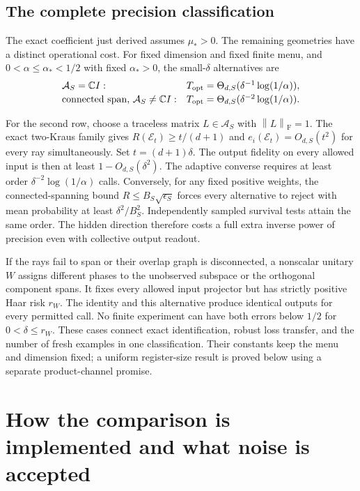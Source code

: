 \documentclass[11pt,a4paper]{article}
\newcommand{\normF}[1]{\left\lVert #1\right\rVert_{\mathrm F}}
\numberwithin{equation}{section}
\begin{document}
\begin{samepage}
\subsection{The complete precision classification}

The exact coefficient just derived assumes $\mu_*>0$. The remaining
geometries have a distinct operational cost. For fixed dimension and fixed
finite menu, and $0<\alpha\le\alpha_*<1/2$ with fixed $\alpha_*>0$,
the small-$\delta$ alternatives are
\[
\begin{array}{ll}
\mathcal A_S=\mathbb CI:
 & T_{\rm opt}=\Theta_{d,S}(\delta^{-1}\log(1/\alpha)),\\[2pt]
\text{connected span, }\mathcal A_S\ne\mathbb CI:
 & T_{\rm opt}=\Theta_{d,S}(\delta^{-2}\log(1/\alpha)).
\end{array}
\]
\end{samepage}
For the second row, choose a traceless matrix $L\in\mathcal A_S$ with
$\normF L=1$. The exact two-Kraus family gives
$R(\mathcal E_t)\ge t/(d+1)$ and $e_i(\mathcal E_t)=O_{d,S}(t^2)$
for every ray simultaneously. Set $t=(d+1)\delta$. The output fidelity
on every allowed input is then at least $1-O_{d,S}(\delta^2)$.
The adaptive converse requires at least order
$\delta^{-2}\log(1/\alpha)$ calls. Conversely, for any fixed positive
weights, the connected-spanning bound $R\le B_S\sqrt{\epsilon_S}$
forces every alternative to reject with mean probability at least
$\delta^2/B_S^2$. Independently sampled survival tests attain the same
order. The hidden direction therefore costs a full extra inverse power
of precision even with collective output readout.

If the rays fail to span or their overlap graph is disconnected, a
nonscalar unitary $W$ assigns different phases to the unobserved subspace
or the orthogonal component spans. It fixes every allowed input projector
but has strictly positive Haar risk $r_W$. The identity and this alternative
produce identical outputs for every permitted call. No finite experiment
can have both errors below $1/2$ for $0<\delta\le r_W$.
These cases connect exact identification, robust loss transfer, and the
number of fresh examples in one classification. Their constants keep the
menu and dimension fixed; a uniform register-size result is proved below
using a separate product-channel promise.

\section{How the comparison is implemented and what noise is accepted}
\end{document}
